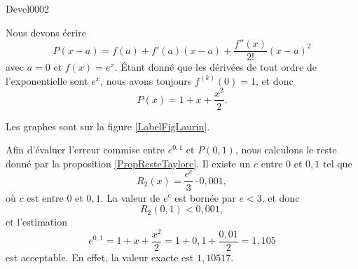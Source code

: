 
\begin{corrige}{Devel0002}


Nous devons écrire
\begin{equation}
	P(x-a)=f(a)+f'(a)(x-a)+\frac{ f''(x) }{ 2! }(x-a)^2
\end{equation}
avec $a=0$ et $f(x)= e^{x}$. Étant donné que les dérivées de tout ordre de l'exponentielle sont $e^x$, nous avons toujours $f^{(k)}(0)=1$, et donc
\begin{equation}
	P(x)=1+x+\frac{ x^2 }{ 2 }.
\end{equation}

Les graphes sont sur la figure \ref{LabelFigLaurin}.
\newcommand{\CaptionFigLaurin}{En bleu : la fonction $x\mapsto e^x$, en cyan l'approximation d'ordre \( 0\), en vert son développement d'ordre $1$ et en rouge celui d'ordre $2$.}


Afin d'évaluer l'erreur commise entre $e^{0,1}$ et $P(0,1)$, nous calculons le reste donné par la proposition \ref{PropResteTaylorc}. Il existe un $c$ entre $0$ et $0,1$ tel que
\begin{equation}
	R_2(x)=\frac{ e^c }{ 3 }\cdot 0,001,
\end{equation}
où $c$ est entre $0$ et $0,1$. La valeur de $e^c$ est bornée par $e<3$, et donc
\begin{equation}
	R_2(0,1)<0,001,
\end{equation}
et l'estimation
\begin{equation}
	e^{0,1}=1+x+\frac{ x^2 }{ 2 }=1+0,1+\frac{ 0,01 }{ 2 }=1,105
\end{equation}
est acceptable. En effet, la valeur \og exacte\fg{} est $1,10517$.

\end{corrige}

